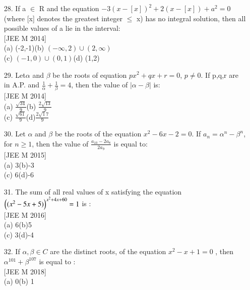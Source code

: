 \documentclass[journal,12pt,twocolumn]{IEEEtran}
\theoremstyle{remark}
\begin{document}
\begin{enumerate}
\item[28.]If a $\in$ R and the equation  $-3(x-[x])^2 +2(x-[x])+a^2 =0$ (where [x] denotes the greatest integer $\leq$ x) has no integral solution, then all possible values of a lie in the interval:\\[2pt]
[JEE M 2014]\\[6pt]
		(a)  (-2,-1)\hspace{2.5cm}(b)  $(-\infty,2)\cup(2,\infty)$\\[2pt]
		(c)  $(-1,0)\cup(0,1)$\hspace{1.1cm}(d)  (1,2)\\[6pt]
\item[29.]Let\quad$\alpha$ and $\beta$ be the roots of equation $px^2 + qx +r = 0$, $p\neq0$. If p,q,r are in A.P. and $\frac{1}{\alpha}+\frac{1}{\beta}=4$, then the value of $|\alpha-\beta|$ is:\\[6pt][JEE M 2014]\\[6pt]
(a)  $\frac{\sqrt{34}}{9}$\hspace{5cm}(b)  $\frac{2\sqrt{13}}{9}$\\[2pt]
(c)  $\frac{\sqrt{61}}{9}$\hspace{5cm}(d)$\frac{2\sqrt17}{9}$\\[6pt]
\item[30.] Let $\alpha$ and $\beta$ be the roots of the equation $x^2-6x-2=0$. If $a_n=\alpha^n-\beta^n$, for $n\geq1$, then the value of $\frac{a_{10}-2a_8}{2a_9}$ is equal to:\\[6pt]
[JEE M 2015]\\[6pt]
(a)  3\hspace{5cm}(b)-3\\[2pt]
(c)  6\hspace{5cm}(d)-6\\[6pt]
\item[31.] The sum of all real values of x satisfying the equation $\left((x^2-5x+5)\right)^{x^2+4x+60}=1$ is :\\[6pt][JEE M 2016]\\[6pt]
(a)  6\hspace{5cm}(b)5\\[2pt]
(c)  3\hspace{5cm}(d)-4\\[6pt]
\item[32.]If $\alpha,\beta\in C$ are the distinct roots, of the equation $x^2-x+1=0$ , then $\alpha^{101}+\beta^{107}$ is equal to :\\[2pt][JEE M 2018]\\[6pt]
(a)  0\hspace{5cm}(b)  1\\[2pt]

\end{enumerate}
\end{document}

